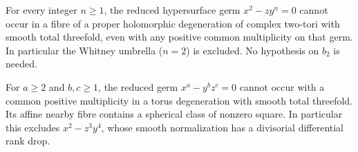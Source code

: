 
\begin{proposition}[P4.16]\hypertarget{tag-02WN}{}\label{night:P4.16}\label{stmt:P4.16}


For every integer $n\geq1$, the reduced hypersurface germ
$x^2-zy^n=0$ cannot occur in a fibre of a proper holomorphic
degeneration of complex two-tori with smooth total threefold,
even with any positive common multiplicity on that germ.
In particular the Whitney umbrella ($n=2$) is excluded.
No hypothesis on $b_2$ is needed.
\end{proposition}

\begin{proposition}[P4.18]\hypertarget{tag-02WP}{}\label{night:P4.18}\label{stmt:P4.18}


For $a\geq2$ and $b,c\geq1$, the reduced germ
$x^a-y^bz^c=0$ cannot occur with a common positive multiplicity
in a torus degeneration with smooth total threefold. Its affine
nearby fibre contains a spherical class of nonzero square.
In particular this excludes $x^2-z^3y^4$, whose smooth
normalization has a divisorial differential rank drop.
\end{proposition}

